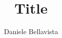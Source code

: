 \documentclass[11pt]{article}
\newcommand{\xauth}{Daniele Bellavista}
\newcommand{\xtitle}{Title}
\begin{document}
\title{\xtitle}
\author{\xauth}

\maketitle


%


\nocite{*}
{}
\end{document}
